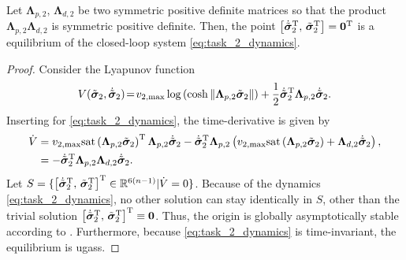 \begin{theorem}
Let $\mathbf{\Lambda}_{p,2}, \, \mathbf{\Lambda}_{d,2}$ be two symmetric positive definite matrices so that the product $\mathbf{\Lambda}_{p,2} \mathbf{\Lambda}_{d,2}$ is symmetric positive definite. Then, the point $\bigl[\dot{\Tilde{\bm{\sigma}}}_2^{\mathrm{T}},\, \Tilde{\bm{\sigma}}_2^{\mathrm{T}}\bigr] = \mathbf{0}^{\mathrm{T}}$ is a  equilibrium of the closed-loop system \eqref{eq:task_2_dynamics}.
\end{theorem}

\begin{proof}
    Consider the Lyapunov function
    \begin{equation}
  V(\Tilde{\bm{\sigma}}_2, \dot{\Tilde{\bm{\sigma}}}_2) \!=\! v_{2,\max}\log\left(\cosh{\|\mathbf{\Lambda}_{p,2}\Tilde{\bm{\sigma}}_{2}\|}\right) + \frac{1}{2}\dot{\Tilde{\bm{\sigma}}}_2^{\mathrm{T}}\mathbf{\Lambda}_{p,2}\dot{\Tilde{\bm{\sigma}}}_2.
\end{equation}
Inserting for \eqref{eq:task_2_dynamics}, the time-derivative is given by
\begin{align}
    \dot{V} &= v_{2,\max}\mathrm{sat}\left(\mathbf{\Lambda}_{p,2}\Tilde{\bm{\sigma}}_{2}\right)^{\mathrm{T}} \mathbf{\Lambda}_{p,2} \dot{\Tilde{\bm{\sigma}}}_2 
                -\dot{\Tilde{\bm{\sigma}}}_2^{\mathrm{T}} \mathbf{\Lambda}_{p,2}\left(v_{2,\max}\mathrm{sat}\left(\mathbf{\Lambda}_{p,2}\Tilde{\bm{\sigma}}_{2}\right) + \mathbf{\Lambda}_{d,2}\dot{\Tilde{\bm{\sigma}}}_2\right), \nonumber \\
    &= -\dot{\Tilde{\bm{\sigma}}}_2^{\mathrm{T}}\mathbf{\Lambda}_{p,2} \mathbf{\Lambda}_{d,2}\dot{\Tilde{\bm{\sigma}}}_2.
\end{align}
Let $S = \{\bigl[\dot{\Tilde{\bm{\sigma}}}_2^{\mathrm{T}},\, \Tilde{\bm{\sigma}}_2^{\mathrm{T}}\bigr]^{\mathrm{T}} \in \mathbb{R}^{6(n-1)} | \dot{V} = 0\}$. Because of the dynamics \eqref{eq:task_2_dynamics}, no other solution can stay identically in $S$, other than the trivial solution $\bigl[\dot{\Tilde{\bm{\sigma}}}_2^{\mathrm{T}},\, \Tilde{\bm{\sigma}}_2^{\mathrm{T}}\bigr]^{\mathrm{T}} \equiv \mathbf{0}$. Thus, the origin is globally asymptotically stable according to \cite[Corollary 4.2]{khalil_nonlinear_2002}. Furthermore, because \eqref{eq:task_2_dynamics} is time-invariant, the equilibrium is \glspl{ugas}.
\end{proof}


